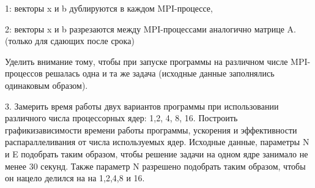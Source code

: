 \documentclass[a4paper, 14pt]{extarticle}
\begin{document}
    
    1: векторы x и b дублируются в каждом MPI-процессе,

    
    2: векторы x и b разрезаются между MPI-процессами аналогично матрице A. (только для сдающих после срока)

    
    Уделить внимание тому, чтобы при запуске программы на различном числе MPI-процессов решалась одна и та же задача (исходные данные заполнялись одинаковым образом).

    
    3. Замерить время работы двух вариантов программы при использовании различного числа процессорных ядер: 1,2, 4, 8, 16. Построить графикизависимости времени работы программы, ускорения и эффективности распараллеливания от числа     используемых ядер. Исходные данные, параметры N и E подобрать таким образом, чтобы решение задачи на одном ядре занимало не  менее 30 секунд. Также параметр N разрешено подобрать таким образом, чтобы он нацело делился на на 1,2,4,8 и 16.

\pagebreak
\end{document}
